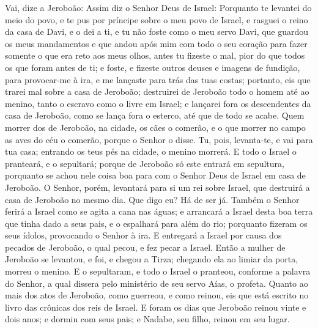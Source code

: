 Vai, dize a Jeroboão: Assim diz o Senhor Deus de Israel: Porquanto
te levantei do meio do povo, e te pus por príncipe sobre o meu povo
de Israel, e rasguei o reino da casa de Davi, e o dei a ti, e tu
não foste como o meu servo Davi, que guardou os meus mandamentos e
que andou após mim com todo o seu coração para fazer somente o que
era reto aos meus olhos, antes tu fizeste o mal, pior do que
todos os que foram antes de ti; e foste, e fizeste outros deuses e
imagens de fundição, para provocar-me à ira, e me lançaste para trás
das tuas costas; portanto, eis que trarei mal sobre a casa de
Jeroboão; destruirei de Jeroboão todo o homem até ao menino, tanto o
escravo como o livre em Israel; e lançarei fora os descendentes da
casa de Jeroboão, como se lança fora o esterco, até que de todo se
acabe. Quem morrer dos de Jeroboão, na cidade, os cães o
comerão, e o que morrer no campo as aves do céu o comerão, porque o
Senhor o disse. Tu, pois, levanta-te, e vai para tua casa;
entrando os teus pés na cidade, o menino morrerá. E todo o
Israel o pranteará, e o sepultará; porque de Jeroboão só este
entrará em sepultura, porquanto se achou nele coisa boa para com o
Senhor Deus de Israel em casa de Jeroboão. O Senhor, porém,
levantará para si um rei sobre Israel, que destruirá a casa de
Jeroboão no mesmo dia. Que digo eu? Há de ser já. Também o
Senhor ferirá a Israel como se agita a cana nas águas; e arrancará a
Israel desta boa terra que tinha dado a seus pais, e o espalhará
para além do rio; porquanto fizeram os seus ídolos, provocando o
Senhor à ira. E entregará a Israel por causa dos pecados de
Jeroboão, o qual pecou, e fez pecar a Israel. Então a mulher
de Jeroboão se levantou, e foi, e chegou a Tirza; chegando ela ao
limiar da porta, morreu o menino. E o sepultaram, e todo o
Israel o pranteou, conforme a palavra do Senhor, a qual dissera pelo
ministério de seu servo Aías, o profeta. Quanto ao mais dos
atos de Jeroboão, como guerreou, e como reinou, eis que está escrito
no livro das crônicas dos reis de Israel. E foram os dias que
Jeroboão reinou vinte e dois anos; e dormiu com seus pais; e Nadabe,
seu filho, reinou em seu lugar.

